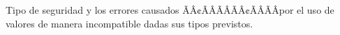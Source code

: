 Tipo de seguridad y los errores causados ÃÂ¢ÃÂÃÂÃÂ¢ÃÂÃÂpor el uso de valores de manera incompatible dadas sus tipos previstos.